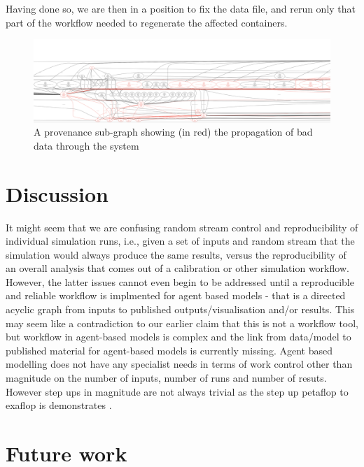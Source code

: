 \documentclass[runningheads]{llncs}
\begin{document}
\normalsize

Having done so, we are then in a position to fix the data file, and rerun only that part of the workflow needed to regenerate the affected containers.

\begin{figure} \includegraphics[width=\textwidth]{img/high-lit-provenance-trace.pdf}
\caption{A provenance sub-graph showing (in red) the propagation of bad data through the system} \label{fig:high-lit-provenance-trace} \end{figure}

\section{Discussion}

It might seem that we are confusing random stream control and reproducibility
of individual simulation runs, i.e., given a set of inputs and random stream
that the simulation would always produce the same results, versus the
reproducibility of an overall analysis that comes out of a calibration or other
simulation workflow. However, the latter issues cannot even begin to be
addressed until a reproducible and reliable workflow is implmented for agent based models -
that is a directed acyclic graph from inputs to published outputs/visualisation
and/or results. This may seem like a contradiction to our earlier claim that
this is not a workflow tool, but workflow in agent-based models is complex and
the link from data/model to published material for agent-based models is
currently missing. Agent based modelling does not have any specialist needs in
terms of work control other than magnitude on the number of inputs, number of
runs and number of resuts. However step ups in magnitude are not always trivial
as the step up petaflop to exaflop is demonstrates
\cite{north2008agent}.



\section{Future work}
\end{document}
